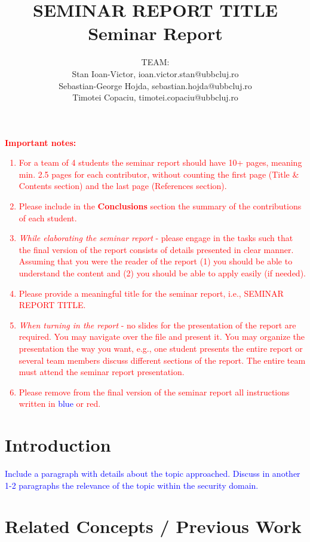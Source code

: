\documentclass{article}
\title{\textbf{SEMINAR REPORT TITLE}\\
Seminar Report}
\author{TEAM:\\
Stan Ioan-Victor, ioan.victor.stan@ubbcluj.ro\\
Sebastian-George Hojda, sebastian.hojda@ubbcluj.ro\\
Timotei Copaciu, timotei.copaciu@ubbcluj.ro
}
\begin{document}
\maketitle

\textcolor{red}{\textbf{Important notes:}
\begin{enumerate}
    \item For a team of 4 students the seminar report should have 10+ pages, meaning min. 2.5 pages for each contributor, without counting the first page (Title \& Contents section) and the last page (References section).
    \item Please include in the \textbf{Conclusions} section the summary of the contributions of each student.
    \item \textit{While elaborating the seminar report} - please engage in the tasks such that the final version of the report consists of details presented in clear manner. Assuming that you were the reader of the report (1) you should be able to understand the content and (2) you should be able to apply easily (if needed).
    \item Please provide a meaningful title for the seminar report, i.e., SEMINAR REPORT TITLE.
    \item \textit{When turning in the report} - no slides for the presentation of the report are required. You may navigate over the file and present it. You may organize the presentation the way you want, e.g., one student presents the entire report or several team members discuss different sections of the report. The entire team must attend the seminar report presentation.
    \item Please remove from the final version of the seminar report all instructions written in \textcolor{blue}{blue} or \textcolor{red}{red}.
\end{enumerate}
}

\tableofcontents

\newpage

\section{Introduction}
\label{label:Introduction}

\textcolor{blue}{Include a paragraph with details about the topic approached. Discuss in another 1-2 paragraphs the relevance of the topic within the security domain.
}


\section{Related Concepts / Previous Work}
\label{label:RelatedConcepts}
\end{document}
